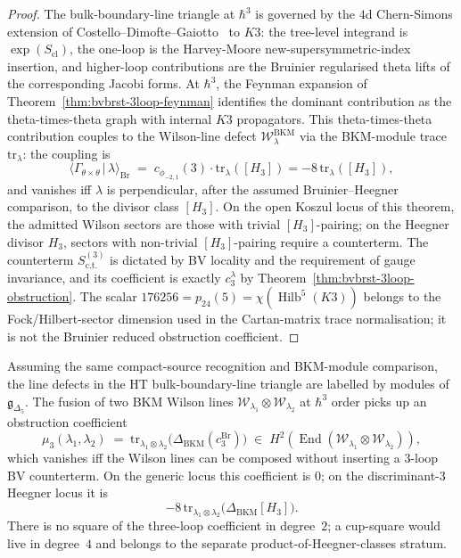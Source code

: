 \begin{proof}
The bulk-boundary-line triangle at $\hbar^3$ is governed by the
$4$d Chern-Simons extension of
Costello--Dimofte--Gaiotto~\cite{CostelloDimofteGaiotto2020} to $K3$:
the tree-level integrand is $\exp(S_{\mathrm{cl}})$, the one-loop is the
Harvey-Moore new-supersymmetric-index insertion, and higher-loop
contributions are the Bruinier regularised theta lifts of the
corresponding Jacobi forms. At $\hbar^3$, the Feynman expansion of
Theorem~\ref{thm:bvbrst-3loop-feynman} identifies the dominant
contribution as the theta-times-theta graph with internal $K3$
propagators. This theta-times-theta contribution couples to the
Wilson-line defect $\mathcal{W}^{\mathrm{BKM}}_\lambda$ via the
BKM-module trace $\mathrm{tr}_\lambda$: the coupling is
\[
 \langle \Gamma_{\theta\times\theta}\,|\,\lambda\rangle_{\mathrm{Br}}
 \;=\;
 c_{\phi_{-2,1}}(3)\cdot\mathrm{tr}_\lambda([H_3])
 = -8\,\mathrm{tr}_\lambda([H_3]),
\]
and vanishes iff $\lambda$ is perpendicular, after the assumed
Bruinier--Heegner comparison, to the divisor class $[H_3]$. On the open
Koszul locus of this theorem, the admitted Wilson sectors are those
with trivial $[H_3]$-pairing; on the Heegner divisor $H_3$, sectors
with non-trivial $[H_3]$-pairing require a counterterm. The counterterm
$S^{(3)}_{\mathrm{c.t.}}$ is dictated by
BV locality and the requirement of gauge invariance, and its
coefficient is exactly $c_3^\lambda$ by
Theorem~\ref{thm:bvbrst-3loop-obstruction}. The scalar
$176256=p_{24}(5)=\chi(\operatorname{Hilb}^5(K3))$ belongs to the
Fock/Hilbert-sector dimension used in the Cartan-matrix trace
normalisation; it is not the Bruinier reduced obstruction coefficient.
\end{proof}

\begin{corollary}
\label{cor:htbb-core-wilson-BKM}
Assuming the same compact-source recognition and BKM-module comparison,
the line defects in the HT bulk-boundary-line triangle are labelled
by modules of $\mathfrak{g}_{\Delta_5}$. The fusion of two BKM Wilson
lines $\mathcal{W}_{\lambda_1}\otimes\mathcal{W}_{\lambda_2}$ at
$\hbar^3$ order picks up an obstruction coefficient
\[
 \mu_3(\lambda_1, \lambda_2)
 \;=\;
 \mathrm{tr}_{\lambda_1\otimes\lambda_2}
 \bigl(\Delta_{\mathrm{BKM}}(c^{\mathrm{Br}}_3)\bigr)
 \;\in\;
 H^2\!\left(
 \operatorname{End}(
 \mathcal{W}_{\lambda_1}\otimes\mathcal{W}_{\lambda_2})
 \right),
\]
which vanishes iff the Wilson lines can be composed without inserting
a $3$-loop BV counterterm. On the generic locus this coefficient is
$0$; on the discriminant-$3$ Heegner locus it is
\[
 -8\,
 \mathrm{tr}_{\lambda_1\otimes\lambda_2}
 \bigl(\Delta_{\mathrm{BKM}}[H_3]\bigr).
\]
There is no square of the three-loop coefficient in degree~$2$; a
cup-square would live in degree~$4$ and belongs to the separate
product-of-Heegner-classes stratum.
\end{corollary}

